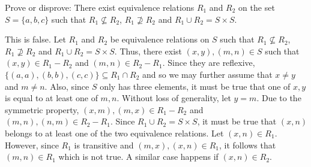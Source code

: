 \documentclass[12pt]{article}
\newenvironment{problem}[2][Problem]{\begin{trivlist}
		\item[\hskip \labelsep {\bfseries #1}\hskip \labelsep {\bfseries #2.}]}{\end{trivlist}}
\newenvironment{solution}[2][Solution]{\begin{trivlist}
		\item[\hskip \labelsep {\bfseries #1}\hskip \labelsep {\bfseries #2.}]}{\end{trivlist}}
\begin{document}
	\begin{problem}{35}
		Prove or disprove: There exist equivalence relations $R_{1}$ and $R_{2}$ on the set $S=\{a,b,c\}$ such that $R_{1} \nsubseteq R_{2}$, $R_{1} \nsupseteq R_{2}$ and $R_{1}\cup R_{2} = S \times S$.
		\begin{solution}{35}
			This is false. Let $R_{1}$ and $R_{2}$ be equivalence relations on $S$ such that $R_{1} \not\subseteq R_{2}$, $R_{1} \not\supseteq R_{2}$ and $R_{1} \cup R_{2} = S\times S$. Thus, there exist $(x,y), (m,n) \in S$ such that $(x,y)\in R_{1}-R_{2}$ and $(m,n)\in R_{2}-R_{1}$. Since they are reflexive, $\{(a,a),(b,b),(c,c)\}\subseteq R_{1}\cap R_{2}$ and so we may further assume that $x\neq y$ and $m\neq n$. Also, since $S$ only has three elements, it must be true that one of $x,y$ is equal to at least one of $m,n$. Without loss of generality, let $y=m$. Due to the symmetric property, $(x,m),(m,x)\in R_{1}-R_{2}$ and $(m,n),(n,m)\in R_{2}-R_{1}$. Since $R_{1} \cup R_{2} = S\times S$, it must be true that $(x,n)$ belongs to at least one of the two equivalence relations. Let $(x,n)\in  R_{1}$. However, since $R_{1}$ is transitive and $(m,x),(x,n)\in R_{1}$, it follows that $(m,n)\in R_{1}$ which is not true. A similar case happens if $(x,n) \in R_{2}$. 
		\end{solution}
	\end{problem}
\end{document}
